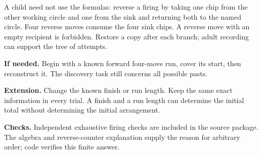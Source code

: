 \documentclass[11pt]{article}
\begin{document}
A child need not use the formulas: reverse a firing by taking one chip from the other working circle and one from the sink and returning both to the named circle. Four reverse moves consume the four sink chips. A reverse move with an empty recipient is forbidden. Restore a copy after each branch; adult recording can support the tree of attempts.

\textbf{If needed.} Begin with a known forward four-move run, cover its start, then reconstruct it. The discovery task still concerns all possible pasts.

\textbf{Extension.} Change the known finish or run length. Keep the same exact information in every trial. A finish and a run length can determine the initial total without determining the initial arrangement.

\textbf{Checks.} Independent exhaustive firing checks are included in the source package. The algebra and reverse-counter explanation supply the reason for arbitrary order; code verifies this finite answer.
\end{document}
